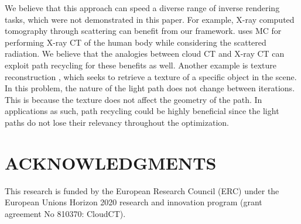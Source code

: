 \documentclass{article}
\begin{document}
We believe that this approach can speed a diverse range of inverse rendering tasks, which were not demonstrated in this paper. For example, X-ray computed tomography through scattering \citep{geva2018x} can benefit from our framework. \citep{geva2018x} uses \ac{MC} for performing X-ray \ac{CT} of the human body while considering the scattered radiation. We believe that the analogies between cloud \ac{CT} and X-ray \ac{CT} can exploit path recycling for these benefits as well. Another example is texture reconstruction \citep{nimier2020radiative}, which seeks to retrieve a texture of a specific object in the scene. In this problem, the nature of the light path does not change between iterations. This is because the texture does not affect the geometry of the path. In applications as such, path recycling could be highly beneficial since the light paths do not lose their relevancy throughout the optimization. 

\section{ACKNOWLEDGMENTS}
This research is funded by the European Research Council (ERC) under the European Unions Horizon 2020 research and innovation program (grant agreement No 810370: CloudCT).
\newpage

\newpage






\end{document}
